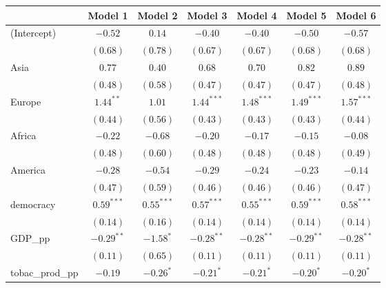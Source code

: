 
\begin{table}[!h]
\begin{center}
\begin{tabular}{l c c c c c c }
\toprule
 & Model 1 & Model 2 & Model 3 & Model 4 & Model 5 & Model 6 \\
\midrule
(Intercept)             & $-0.52$      & $0.14$       & $-0.40$      & $-0.40$      & $-0.50$      & $-0.57$      \\
                        & $(0.68)$     & $(0.78)$     & $(0.67)$     & $(0.67)$     & $(0.68)$     & $(0.68)$     \\
Asia                    & $0.77$       & $0.40$       & $0.68$       & $0.70$       & $0.82$       & $0.89$       \\
                        & $(0.48)$     & $(0.58)$     & $(0.47)$     & $(0.47)$     & $(0.47)$     & $(0.48)$     \\
Europe                  & $1.44^{**}$  & $1.01$       & $1.44^{***}$ & $1.48^{***}$ & $1.49^{***}$ & $1.57^{***}$ \\
                        & $(0.44)$     & $(0.56)$     & $(0.43)$     & $(0.43)$     & $(0.43)$     & $(0.44)$     \\
Africa                  & $-0.22$      & $-0.68$      & $-0.20$      & $-0.17$      & $-0.15$      & $-0.08$      \\
                        & $(0.48)$     & $(0.60)$     & $(0.48)$     & $(0.48)$     & $(0.48)$     & $(0.49)$     \\
America                 & $-0.28$      & $-0.54$      & $-0.29$      & $-0.24$      & $-0.23$      & $-0.14$      \\
                        & $(0.47)$     & $(0.59)$     & $(0.46)$     & $(0.46)$     & $(0.46)$     & $(0.47)$     \\
democracy               & $0.59^{***}$ & $0.55^{***}$ & $0.57^{***}$ & $0.55^{***}$ & $0.59^{***}$ & $0.58^{***}$ \\
                        & $(0.14)$     & $(0.16)$     & $(0.14)$     & $(0.14)$     & $(0.14)$     & $(0.14)$     \\
GDP\_pp                 & $-0.29^{**}$ & $-1.58^{*}$  & $-0.28^{**}$ & $-0.28^{**}$ & $-0.29^{**}$ & $-0.28^{**}$ \\
                        & $(0.11)$     & $(0.65)$     & $(0.11)$     & $(0.11)$     & $(0.11)$     & $(0.11)$     \\
tobac\_prod\_pp         & $-0.19$      & $-0.26^{*}$  & $-0.21^{*}$  & $-0.21^{*}$  & $-0.20^{*}$  & $-0.20^{*}$  \\

\end{tabular}
\end{center}
\end{table}
